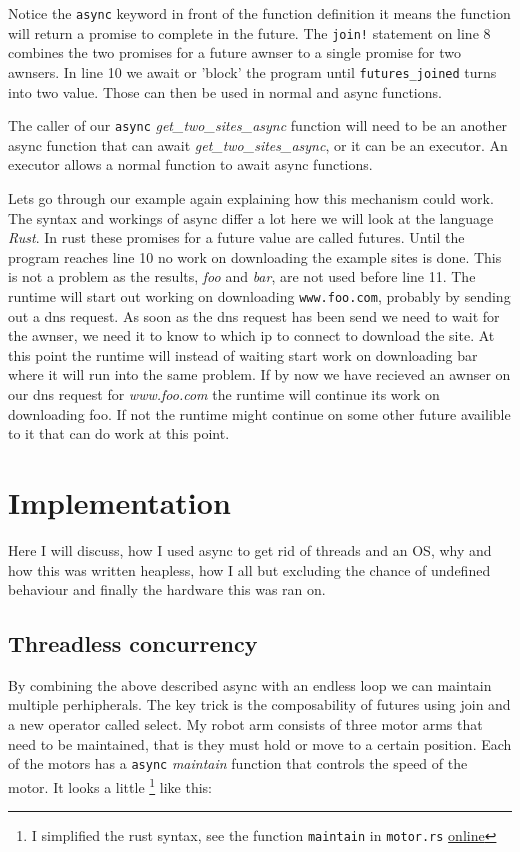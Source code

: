 \documentclass[lang=en, hanging-titles=true]{skrapport}
\begin{document}
Notice the \texttt{async} keyword in front of the function definition it means the function will return a promise to complete in the future. The \texttt{join!} statement on line 8 combines the two promises for a future awnser to a single promise for two awnsers. In line 10 we await or 'block' the program until \texttt{futures\_joined} turns into two value. Those can then be used in normal and async functions.

The caller of our \texttt{async} \textit{get\_two\_sites\_async} function will need to be an another async function that can await \textit{get\_two\_sites\_async}, or it can be an executor. An executor allows a normal function to await async functions.

Lets go through our example again explaining how this mechanism could work. The syntax and workings of async differ a lot here we will look at the language \textit{Rust}. In rust these promises for a future value are called futures. Until the program reaches line 10 no work on downloading the example sites is done. This is not a problem as the results, \textit{foo} and \textit{bar}, are not used before line 11. The runtime will start out working on downloading \texttt{www.foo.com}, probably by sending out a dns request. As soon as the dns request has been send we need to wait for the awnser, we need it to know to which ip to connect to download the site. At this point the runtime will instead of waiting start work on downloading bar where it will run into the same problem. If by now we have recieved an awnser on our dns request for \textit{www.foo.com} the runtime will continue its work on downloading foo. If not the runtime might continue on some other future availible to it that can do work at this point.

\clearpage
\section{Implementation}
Here I will discuss, how I used async to get rid of threads and an OS, why and how this was written heapless, how I all but excluding the chance of undefined behaviour and finally the hardware this was ran on.

\subsection{Threadless concurrency}
By combining the above described async with an endless loop we can maintain multiple perhipherals. The key trick is the composability of futures using join and a new operator called select. My robot arm consists of three motor arms that need to be maintained, that is they must hold or move to a certain position. Each of the motors has a \texttt{async} \textit{maintain} function that controls the speed of the motor. It looks a little %
\footnote{I simplified the rust syntax, see the function \texttt{maintain} in \texttt{motor.rs} \href{https://github.com/dskleingeld/robotic-arm/blob/main/src/hinge/motor.rs}{online}} 
like this:
\end{document}

